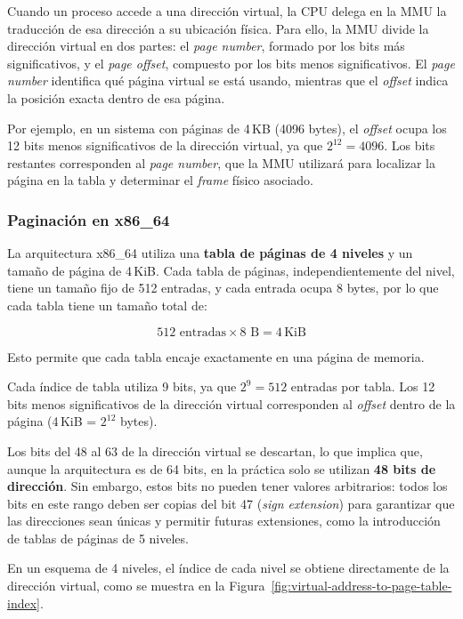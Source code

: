 Cuando un proceso accede a una dirección virtual, la CPU delega en la MMU la traducción de esa dirección a su ubicación física. Para ello, la MMU divide la dirección virtual en dos partes: el \textit{page number}, formado por los bits más significativos, y el \textit{page offset}, compuesto por los bits menos significativos. El \textit{page number} identifica qué página virtual se está usando, mientras que el \textit{offset} indica la posición exacta dentro de esa página.

Por ejemplo, en un sistema con páginas de 4\,KB (4096 bytes), el \textit{offset} ocupa los 12 bits menos significativos de la dirección virtual, ya que \(2^{12} = 4096\). Los bits restantes corresponden al \textit{page number}, que la MMU utilizará para localizar la página en la tabla y determinar el \textit{frame} físico asociado.

\subsubsection{Paginación en x86\_64}

La arquitectura x86\_64 utiliza una \textbf{tabla de páginas de 4 niveles} y un tamaño de página de 4\,KiB. Cada tabla de páginas, independientemente del nivel, tiene un tamaño fijo de 512 entradas, y cada entrada ocupa 8 bytes, por lo que cada tabla tiene un tamaño total de:

\[
512 \text{ entradas} \times 8 \text{ B} = 4\,\text{KiB}
\]

Esto permite que cada tabla encaje exactamente en una página de memoria.

Cada índice de tabla utiliza 9 bits, ya que \(2^9 = 512\) entradas por tabla. Los 12 bits menos significativos de la dirección virtual corresponden al \textit{offset} dentro de la página (4\,KiB = \(2^{12}\) bytes).  

Los bits del 48 al 63 de la dirección virtual se descartan, lo que implica que, aunque la arquitectura es de 64 bits, en la práctica solo se utilizan \textbf{48 bits de dirección}.  
Sin embargo, estos bits no pueden tener valores arbitrarios: todos los bits en este rango deben ser copias del bit 47 (\textit{sign extension}) para garantizar que las direcciones sean únicas y permitir futuras extensiones, como la introducción de tablas de páginas de 5 niveles.

En un esquema de 4 niveles, el índice de cada nivel se obtiene directamente de la dirección virtual, como se muestra en la Figura~\ref{fig:virtual-address-to-page-table-index}.

